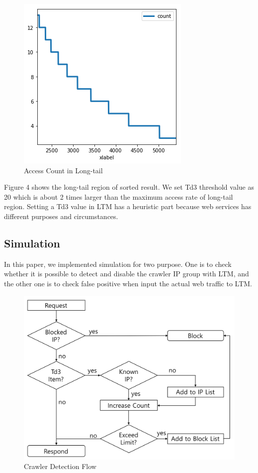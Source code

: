 \documentclass[sigconf,anonymous=true]{acmart}
\begin{document}
\begin{figure}[H]
    \centering
    \includegraphics[width=0.85\columnwidth]{figs/figure_04_td3.png}
    \caption{Access Count in Long-tail}
    \label{fig:my_label}
\end{figure}

Figure 4 shows the long-tail region of sorted result. We set Td3 threshold value as 20 which is about 2 times larger than the maximum access rate of long-tail region. Setting a Td3 value in LTM has a heuristic part because web services has different purposes and circumstances.

\subsection{Simulation}
In this paper, we implemented simulation for two purpose. One is to check whether it is possible to detect and disable the crawler IP group with LTM, and the other one is to check false positive when input the actual web traffic to LTM.

\begin{figure} [H]
    \includegraphics[width=0.88\columnwidth]{figs/flow_chart_01.png}
    \caption{Crawler Detection Flow}
    \label{fig:my_label}
\end{figure}
\end{document}
